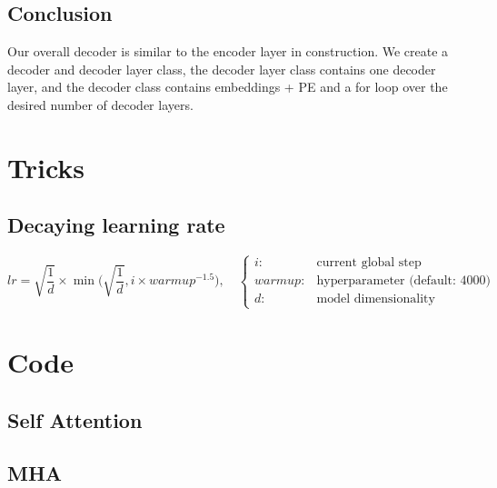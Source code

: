 \documentclass[11pt]{article}
\begin{document}
\subsection{Conclusion}

Our overall decoder is similar to the encoder layer in construction. We create a decoder and decoder layer class, the decoder layer class contains one decoder layer, and the decoder class contains embeddings + PE and a for loop over the desired number of decoder layers.

\section{Tricks}

\subsection{Decaying learning rate}

\begin{equation}
    lr = \sqrt{\frac 1 d } \times \min\Bigg(\sqrt{\frac 1 d}, i \times warmup^{-1.5}\Bigg), \quad \begin{cases}
        i: & \text{current global step} \\ 
        warmup: & \text{hyperparameter (default: 4000)} \\
        d: & \text{model dimensionality}
    \end{cases}
\end{equation}

\section{Code}

\subsection{Self Attention}



\subsection{MHA}



\end{document}
